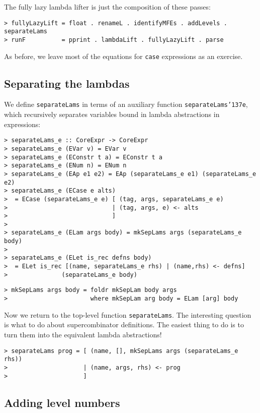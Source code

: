 The fully lazy lambda lifter is just the composition of these passes:
\begin{verbatim}
> fullyLazyLift = float . renameL . identifyMFEs . addLevels . separateLams
> runF          = pprint . lambdaLift . fullyLazyLift . parse
\end{verbatim}
%
%
As before, we leave most of the equations
for \mbox{\tt case} expressions as an exercise.

\subsection{Separating the lambdas}
\label{separatelams}

We define \mbox{\tt separateLams} in terms of an auxiliary function \mbox{\tt separateLams{\char'137}e},
which recursively separates variables bound in lambda abstractions in
expressions:
\begin{verbatim}
> separateLams_e :: CoreExpr -> CoreExpr
> separateLams_e (EVar v) = EVar v
> separateLams_e (EConstr t a) = EConstr t a
> separateLams_e (ENum n) = ENum n
> separateLams_e (EAp e1 e2) = EAp (separateLams_e e1) (separateLams_e e2)
> separateLams_e (ECase e alts)
>  = ECase (separateLams_e e) [ (tag, args, separateLams_e e)
>                             | (tag, args, e) <- alts
>                             ]
>
> separateLams_e (ELam args body) = mkSepLams args (separateLams_e body)
>
> separateLams_e (ELet is_rec defns body)
>  = ELet is_rec [(name, separateLams_e rhs) | (name,rhs) <- defns]
>               (separateLams_e body)
\end{verbatim}
\begin{verbatim}
> mkSepLams args body = foldr mkSepLam body args
>                       where mkSepLam arg body = ELam [arg] body
\end{verbatim}
%
\par
Now we return to the top-level function \mbox{\tt separateLams}.
The interesting question is what to do about supercombinator definitions.
The easiest thing to do is to turn them into the equivalent
lambda abstractions!
\begin{verbatim}
> separateLams prog = [ (name, [], mkSepLams args (separateLams_e rhs))
>                     | (name, args, rhs) <- prog
>                     ]
\end{verbatim}
%
\subsection{Adding level numbers}
\label{levels}

